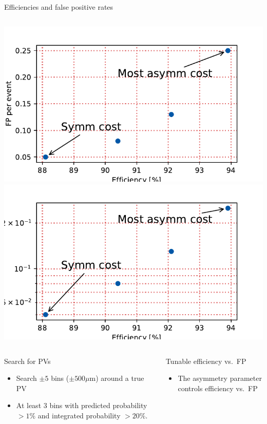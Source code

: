 \begin{frame}{Efficiencies and false positive rates}
\begin{columns}
\includegraphics[width=\textwidth]{images/EffVsFP.pdf}
\includegraphics[width=\textwidth]{images/EffVsFP_semilog.pdf}
\end{columns}

  \begin{columns}
  \begin{block}{Search for PVs}
    \begin{itemize}
    	\item Search $ \pm 5 $ bins ($ \pm 500 \mu $m) around a true PV
    	\item At least 3 bins with predicted probability
    	   $ > 1\% $ and
    	   integrated probability $ > 20\%$.
    \end{itemize}
    \end{block}

    \begin{block}{Tunable efficiency vs.\ FP}
    \begin{itemize}
        \item The asymmetry parameter controls efficiency vs.\ FP
    \end{itemize}
  \end{block}
\end{columns}
\end{frame}
